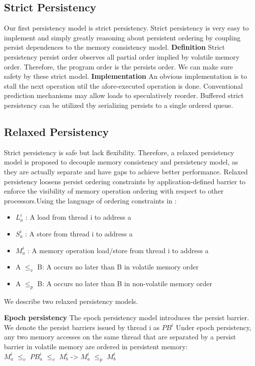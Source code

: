 \documentclass{sig-alternate}
\begin{document}
\subsection{Strict Persistency}  

Our first persistency model is strict persistency. Strict persistency is very easy to implement and simply greatly reasoning about persistent ordering by coupling persist dependences to the memory consistency model. 
\textbf{Definition} Strict persistency persist order observes all partial order implied by volatile memory order. Therefore, the program order is the persists order. We can make sure safety by these strict model.
\textbf{Implementation} An obvious implementation is to stall the next operation util the afore-executed operation is done. Conventional prediction mechanisms may allow loads to speculatively reorder. Buffered strict persistency can be utilized tby serializing persists to a single ordered queue.

\subsection{Relaxed Persistency}

Strict persistency is safe but lack flexibility. Therefore, a relaxed persistency model is proposed to decouple memory consistency and persistency model, as they are actually separate and have gaps to achieve better performance.
	Relaxed persistency loosens persist ordering constraints by application-defined barrier to enforce the visibility of memory operation ordering with respect to other processors.Using the language of ordering constraints in \cite{Kolli:2016:HTP:2954679.2872381}:

\begin{itemize}
\item $L^{i}_a$ : A load from thread i to address a
\item $S^{i}_a$ : A store from thread i to address a
\item $M^{i}_a$ : A memory operation load/store from thread i to address a
\item A $\leq_v$ B: A occurs no later than B in volatile memory order
\item A $\leq_p$ B: A occurs no later than B in non-volatile memory order
\end{itemize}

We describe two relaxed persistency models.

\textbf{Epoch persistency} The epoch persistency model introduces the persist barrier. We denote the persist barriers issued by thread i as $PB^{i}$
Under epoch persistency, any two memory accesses on the same thread that are separated by a persist barrier in volatile memory are ordered in persistent memory:
\\
$M^{i}_a$ $\leq_v$ $PB^{i}_a$ $\leq_v$ $M^{i}_b$   ->  $M^{i}_a$ $\leq_p$ $M^{i}_b$ 
\\
\end{document}
